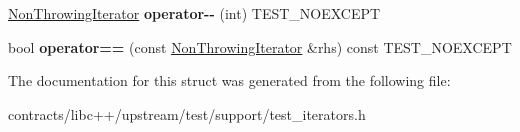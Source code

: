 \begin{DoxyCompactItemize}
\item 
\mbox{\label{struct_non_throwing_iterator_a532b4ae9a520a4d580eb4f6044dbac25}} 
\mbox{\hyperlink{struct_non_throwing_iterator}{Non\+Throwing\+Iterator}} {\bfseries operator-\/-\/} (int) T\+E\+S\+T\+\_\+\+N\+O\+E\+X\+C\+E\+PT
\item 
\mbox{\label{struct_non_throwing_iterator_acc90025fce488b7311a728d29cd121b0}} 
bool {\bfseries operator==} (const \mbox{\hyperlink{struct_non_throwing_iterator}{Non\+Throwing\+Iterator}} \&rhs) const T\+E\+S\+T\+\_\+\+N\+O\+E\+X\+C\+E\+PT
\end{DoxyCompactItemize}


The documentation for this struct was generated from the following file\+:\begin{DoxyCompactItemize}
\item 
contracts/libc++/upstream/test/support/test\+\_\+iterators.\+h\end{DoxyCompactItemize}
